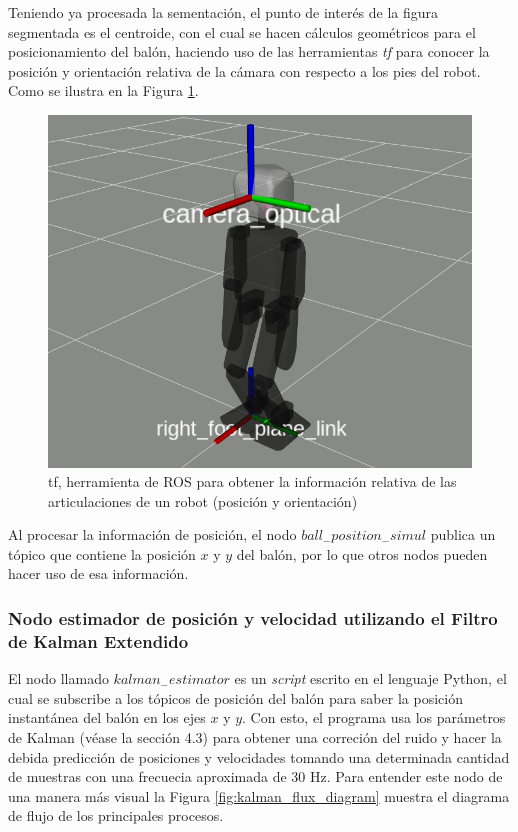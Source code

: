 			Teniendo ya procesada la sementación, el punto de interés de la figura segmentada es el centroide, con el cual se hacen cálculos geométricos para el posicionamiento del balón, haciendo uso de las herramientas \textit{tf} para conocer la posición y orientación relativa de la cámara con respecto a los pies del robot. Como se ilustra en la Figura \ref{fig:tf}.
			
\begin{figure}
	\centering
	\includegraphics[scale=0.25]{images/tf.png}
	\caption{tf, herramienta de ROS para obtener la información relativa de las articulaciones de un robot (posición y orientación)}
	\label{fig:tf}
\end{figure}
	
			Al procesar la información de posición, el nodo $ball_-position_-simul$ publica un tópico que contiene la posición $x$ y $y$ del balón, por lo que otros nodos pueden hacer uso de esa información.
			
			\subsubsection*{Nodo estimador de posición y velocidad utilizando el Filtro de Kalman Extendido}
			El nodo llamado $kalman_-estimator$ es un \textit{script} escrito en el lenguaje Python, el cual se subscribe a los tópicos de posición del balón para saber la posición instantánea del balón en los ejes $x$ y $y$. Con esto, el programa usa los parámetros de Kalman (véase la sección 4.3) para obtener una correción del ruido y hacer la debida predicción de posiciones y velocidades tomando una determinada cantidad de muestras con una frecuecia aproximada de 30 Hz. Para entender este nodo de una manera más visual la Figura \ref{fig:kalman_flux_diagram} muestra el diagrama de flujo de los principales procesos. 
			
